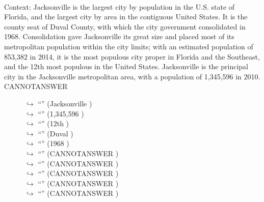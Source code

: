 \documentclass[11pt,a4paper, onecolumn]{article}
\begin{document}
\\ Context: Jacksonville is the largest city by population in the U.S. state of Florida, and the largest city by area in the contiguous United States. It is the county seat of Duval County, with which the city government consolidated in 1968. Consolidation gave Jacksonville its great size and placed most of its metropolitan population within the city limits; with an estimated population of 853,382 in 2014, it is the most populous city proper in Florida and the Southeast, and the 12th most populous in the United States. Jacksonville is the principal city in the Jacksonville metropolitan area, with a population of 1,345,596 in 2010. CANNOTANSWER

\begin{figure}[t] \small \begin{tcolorbox}[boxsep=0pt,left=5pt,right=0pt,top=2pt,colback = yellow!5] \begin{dialogue}
 \small 
\colorbox{pink!25}{$\hookrightarrow$}
{ ``'' (Jacksonville ) }
\\
\colorbox{pink!25}{$\hookrightarrow$}
{ ``'' (1,345,596 ) }
\\
\colorbox{pink!25}{$\hookrightarrow$}
{ ``'' (12th ) }
\\
\colorbox{pink!25}{$\hookrightarrow$}
{ ``'' (Duval ) }
\\
\colorbox{pink!25}{$\hookrightarrow$}
{ ``'' (1968 ) }
\\
\colorbox{pink!25}{$\hookrightarrow$}
{ ``'' (CANNOTANSWER ) }
\\
\colorbox{pink!25}{$\hookrightarrow$}
{ ``'' (CANNOTANSWER ) }
\\
\colorbox{pink!25}{$\hookrightarrow$}
{ ``'' (CANNOTANSWER ) }
\\
\colorbox{pink!25}{$\hookrightarrow$}
{ ``'' (CANNOTANSWER ) }
\\
\colorbox{pink!25}{$\hookrightarrow$}
{ ``'' (CANNOTANSWER ) }
\\
 \end{dialogue}\end{tcolorbox}\end{figure}
\end{document}
